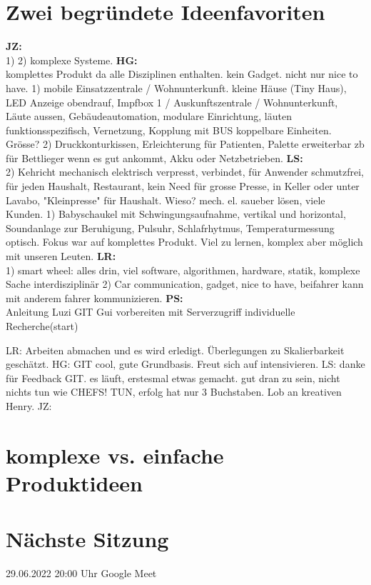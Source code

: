 \documentclass[10pt]{extarticle}
\begin{document}
\section{Zwei begründete Ideenfavoriten}
\textbf{JZ:}\\ 1) 2) komplexe Systeme.
\textbf{HG:}\\ komplettes Produkt da alle Disziplinen enthalten. kein Gadget. nicht nur nice to have. 1) mobile Einsatzzentrale / Wohnunterkunft. kleine Häuse (Tiny Haus), LED Anzeige obendrauf, Impfbox 1 / Auskunftszentrale / Wohnunterkunft, Läute aussen, Gebäudeautomation, modulare Einrichtung, läuten funktionsspezifisch, Vernetzung, Kopplung mit BUS koppelbare Einheiten. Grösse? 2) Druckkonturkissen, Erleichterung für Patienten, Palette erweiterbar zb für Bettlieger wenn es gut ankommt, Akku oder Netzbetrieben.
\textbf{LS:}\\ 2) Kehricht mechanisch elektrisch verpresst, verbindet, für Anwender schmutzfrei, für jeden Haushalt, Restaurant, kein Need für grosse Presse, in Keller oder unter Lavabo, "Kleinpresse" für Haushalt. Wieso? mech. el. saueber lösen, viele Kunden.
1) Babyschaukel mit Schwingungsaufnahme, vertikal und horizontal, Soundanlage zur Beruhigung, Pulsuhr, Schlafrhytmus, Temperaturmessung optisch. Fokus war auf komplettes Produkt. Viel zu lernen, komplex aber möglich mit unseren Leuten. 
\textbf{LR:}\\ 1) smart wheel: alles drin, viel software, algorithmen, hardware, statik, komplexe Sache interdisziplinär 2) Car communication, gadget, nice to have, beifahrer kann mit anderem fahrer kommunizieren.
\textbf{PS:}\\

Anleitung Luzi
GIT Gui vorbereiten mit Serverzugriff
individuelle Recherche(start)

LR: Arbeiten abmachen und es wird erledigt. Überlegungen zu Skalierbarkeit geschätzt.
HG: GIT cool, gute Grundbasis. Freut sich auf intensivieren.
LS: danke für Feedback GIT. es läuft, erstesmal etwas gemacht. gut dran zu sein, nicht nichts tun wie CHEFS! TUN, erfolg hat nur 3 Buchstaben. Lob an kreativen Henry.
JZ: 

\section{komplexe vs. einfache Produktideen}

\vspace{2cm}
\section*{Nächste Sitzung}
29.06.2022 20:00 Uhr Google Meet
\end{document}
